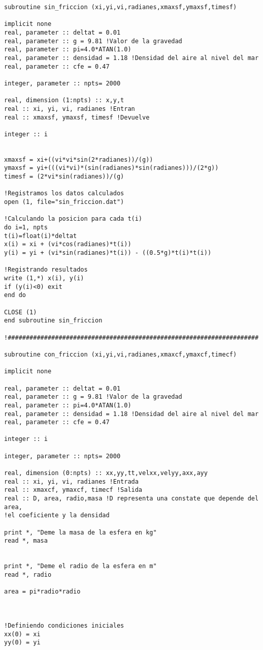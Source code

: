 \documentclass[10pt]{article}
\begin{document}
\begin{verbatim}
subroutine sin_friccion (xi,yi,vi,radianes,xmaxsf,ymaxsf,timesf)

implicit none
real, parameter :: deltat = 0.01
real, parameter :: g = 9.81 !Valor de la gravedad
real, parameter :: pi=4.0*ATAN(1.0)
real, parameter :: densidad = 1.18 !Densidad del aire al nivel del mar
real, parameter :: cfe = 0.47

integer, parameter :: npts= 2000 

real, dimension (1:npts) :: x,y,t
real :: xi, yi, vi, radianes !Entran
real :: xmaxsf, ymaxsf, timesf !Devuelve

integer :: i


xmaxsf = xi+((vi*vi*sin(2*radianes))/(g))
ymaxsf = yi+(((vi*vi)*(sin(radianes)*sin(radianes)))/(2*g))
timesf = (2*vi*sin(radianes))/(g)

!Registramos los datos calculados
open (1, file="sin_friccion.dat")

!Calculando la posicion para cada t(i)
do i=1, npts
t(i)=float(i)*deltat
x(i) = xi + (vi*cos(radianes)*t(i))
y(i) = yi + (vi*sin(radianes)*t(i)) - ((0.5*g)*t(i)*t(i))

!Registrando resultados
write (1,*) x(i), y(i)
if (y(i)<0) exit
end do

CLOSE (1)
end subroutine sin_friccion

!#####################################################################

subroutine con_friccion (xi,yi,vi,radianes,xmaxcf,ymaxcf,timecf)

implicit none

real, parameter :: deltat = 0.01
real, parameter :: g = 9.81 !Valor de la gravedad
real, parameter :: pi=4.0*ATAN(1.0)
real, parameter :: densidad = 1.18 !Densidad del aire al nivel del mar
real, parameter :: cfe = 0.47

integer :: i 

integer, parameter :: npts= 2000 

real, dimension (0:npts) :: xx,yy,tt,velxx,velyy,axx,ayy 
real :: xi, yi, vi, radianes !Entrada
real :: xmaxcf, ymaxcf, timecf !Salida
real :: D, area, radio,masa !D representa una constate que depende del area, 
!el coeficiente y la densidad

print *, "Deme la masa de la esfera en kg"
read *, masa


print *, "Deme el radio de la esfera en m"
read *, radio

area = pi*radio*radio



!Definiendo condiciones iniciales
xx(0) = xi
yy(0) = yi


\end{verbatim}
\end{document}
